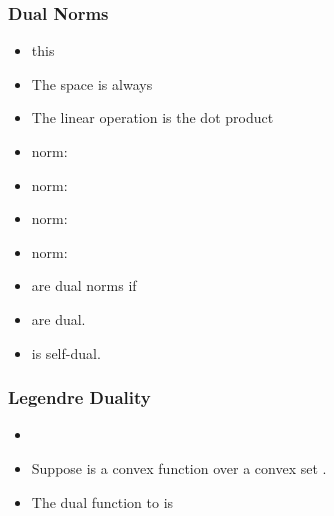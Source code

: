 \documentclass{beamer}
\begin{document}
\begin{frame}
\frametitle{Dual Norms}
\begin{itemize}
  \item this
  \item The space is always 
  \item The linear operation is the dot product \R{$\vu \cdot \vv$}
\item {} norm: 
\item {} norm: 
\item {} norm: 
\item {} norm: 
\item {} are dual norms if 
\item {} are dual.
\item {} is self-dual. 
\end{itemize}
\end{frame}

\begin{frame}
\frametitle{Legendre Duality}
\begin{itemize}
  \item {}
\item Suppose  is a convex function over a convex set .
\item The dual function to  is
\end{itemize}
\end{frame}
\end{document}
